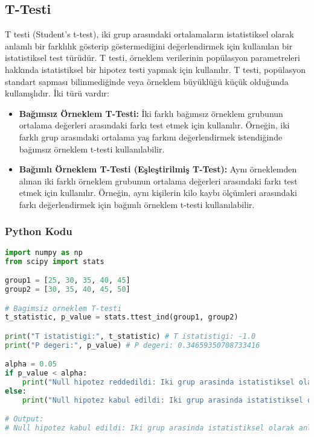 \newpage

\subsection{T-Testi}
T testi (Student's t-test), iki grup arasındaki ortalamaların istatistiksel olarak anlamlı bir farklılık gösterip göstermediğini değerlendirmek için kullanılan bir istatistiksel test türüdür. T testi, örneklem verilerinin popülasyon parametreleri hakkında istatistiksel bir hipotez testi yapmak için kullanılır. T testi,  popülasyon standart sapması bilinmediğinde veya örneklem büyüklüğü küçük olduğunda kullanışlıdır. İki türü vardır:

\begin{itemize}
    \item \textbf{Bağımsız Örneklem T-Testi:} İki farklı bağımsız örneklem grubunun ortalama değerleri arasındaki farkı test etmek için kullanılır. Örneğin, iki farklı grup arasındaki ortalama yaş farkını değerlendirmek istendiğinde bağımsız örneklem t-testi kullanılabilir.
    \item \textbf{Bağımlı Örneklem T-Testi (Eşleştirilmiş T-Test):} Aynı örneklemden alınan iki farklı örneklem grubunun ortalama değerleri arasındaki farkı test etmek için kullanılır. Örneğin, aynı kişilerin kilo kaybı ölçümleri arasındaki farkı değerlendirmek için bağımlı örneklem t-testi kullanılabilir.
\end{itemize}

\subsubsection{Python Kodu}

\begin{lstlisting}[language=Python]
import numpy as np
from scipy import stats

group1 = [25, 30, 35, 40, 45]
group2 = [30, 35, 40, 45, 50]

# Bagimsiz orneklem T-testi
t_statistic, p_value = stats.ttest_ind(group1, group2)

print("T istatistigi:", t_statistic) # T istatistigi: -1.0
print("P degeri:", p_value) # P degeri: 0.34659350708733416

alpha = 0.05
if p_value < alpha:
    print("Null hipotez reddedildi: Iki grup arasinda istatistiksel olarak anlamli bir fark vardir.")
else:
    print("Null hipotez kabul edildi: Iki grup arasinda istatistiksel olarak anlamli bir fark yoktur.")

# Output:
# Null hipotez kabul edildi: Iki grup arasinda istatistiksel olarak anlamli bir fark yoktur.
\end{lstlisting}


